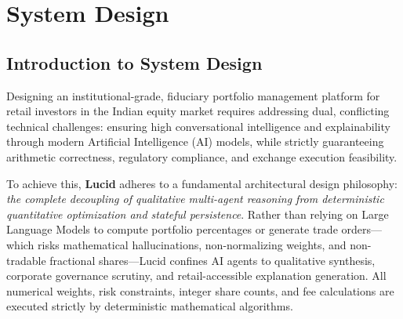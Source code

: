 \chapter{System Design}
\label{ch:system_design}

\section{Introduction to System Design}
Designing an institutional-grade, fiduciary portfolio management platform for retail investors in the Indian equity market requires addressing dual, conflicting technical challenges: ensuring high conversational intelligence and explainability through modern Artificial Intelligence (AI) models, while strictly guaranteeing arithmetic correctness, regulatory compliance, and exchange execution feasibility.

To achieve this, \textbf{Lucid} adheres to a fundamental architectural design philosophy: \textit{the complete decoupling of qualitative multi-agent reasoning from deterministic quantitative optimization and stateful persistence}. Rather than relying on Large Language Models to compute portfolio percentages or generate trade orders---which risks mathematical hallucinations, non-normalizing weights, and non-tradable fractional shares---Lucid confines AI agents to qualitative synthesis, corporate governance scrutiny, and retail-accessible explanation generation. All numerical weights, risk constraints, integer share counts, and fee calculations are executed strictly by deterministic mathematical algorithms.


